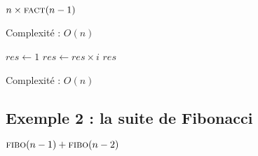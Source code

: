 \begin{algorithm}[H]
\caption{$\algo{fact}(n\in\mathbb{N})$}
\begin{algorithmic}[1]
	\State{}
\Else
	\State\Return $n \times \textsc{fact}(n-1)$
\EndIf
\end{algorithmic}
\end{algorithm}

Complexité : $O(n)$


\begin{algorithm}[H]
\caption{$\algo{fact\_it}(n\in\mathbb{N})$}
\begin{algorithmic}[1]
\State $res\gets 1$
	\State $res \gets res \times i$
\EndFor
\State\Return $res$
\end{algorithmic}
\end{algorithm}

Complexité : $O(n)$

\subsection{Exemple 2 : la suite de Fibonacci}

\begin{algorithm}[H]
\caption{$\algo{fibo}(n\in\mathbb{N})$}
\begin{algorithmic}[1]
	\State{}
	\State{}
\Else
	\State\Return $\textsc{fibo}(n-1) + \textsc{fibo}(n-2)$
\EndIf
\end{algorithmic}
\end{algorithm}

